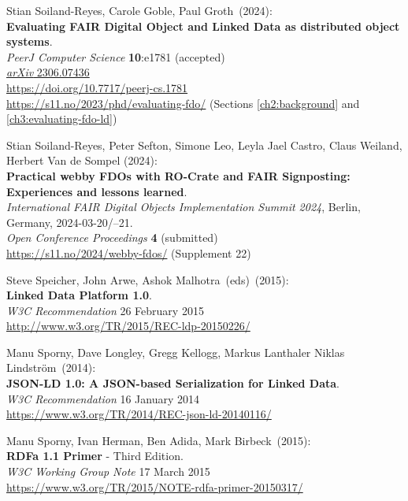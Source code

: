 \begin{thebibliography}{9}
Stian Soiland-Reyes, Carole Goble, Paul Groth~(2024): \\
\textbf{Evaluating FAIR Digital Object and Linked Data as distributed object systems}.\\
\emph{PeerJ Computer Science} \textbf{10}:e1781 (accepted) \\
\href{https://doi.org/10.48550/arXiv.2306.07436}{\emph{arXiv} 2306.07436} \\
\url{https://doi.org/10.7717/peerj-cs.1781} \\
\url{https://s11.no/2023/phd/evaluating-fdo/} 
(Sections \vref{ch2:background} and \vref{ch3:evaluating-fdo-ld})

Stian Soiland-Reyes, Peter Sefton, Simone Leo, Leyla Jael Castro, Claus Weiland, Herbert Van de Sompel (2024):  \\
\textbf{Practical webby FDOs with RO-Crate and FAIR Signposting: Experiences and lessons learned}.  \\
\emph{International FAIR Digital Objects Implementation Summit 2024}, Berlin, Germany, 2024-03-20/--21.  \\
\emph{Open Conference Proceedings} \textbf{4} (submitted) \\
\url{https://s11.no/2024/webby-fdos/} (Supplement 22)

Steve Speicher, John Arwe, Ashok Malhotra~(eds)~(2015): \\
\textbf{Linked Data Platform 1.0}.\\ 
\emph{W3C Recommendation} 26 February 2015\\
\url{http://www.w3.org/TR/2015/REC-ldp-20150226/}

Manu Sporny, Dave Longley,  Gregg Kellogg,  Markus Lanthaler Niklas Lindström~(2014): \\
\textbf{JSON-LD 1.0: A JSON-based Serialization for Linked Data}.\\
\emph{W3C Recommendation} 16 January 2014\\
\url{https://www.w3.org/TR/2014/REC-json-ld-20140116/}

Manu Sporny, Ivan Herman, Ben Adida, Mark Birbeck~(2015): \\
\textbf{RDFa 1.1 Primer} - Third Edition. \\
\emph{W3C Working Group Note} 17 March 2015 \\
\url{https://www.w3.org/TR/2015/NOTE-rdfa-primer-20150317/}


\end{thebibliography}
